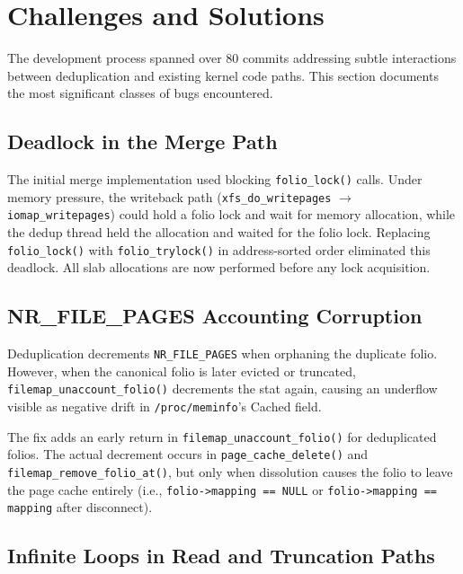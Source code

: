 \documentclass[conference]{IEEEtran}
\begin{document}
\section{Challenges and Solutions}
\label{sec:challenges}

The development process spanned over 80 commits addressing subtle interactions between deduplication and existing kernel code paths. This section documents the most significant classes of bugs encountered.

\subsection{Deadlock in the Merge Path}

The initial merge implementation used blocking \texttt{folio\_lock()} calls. Under memory pressure, the writeback path (\texttt{xfs\_do\_writepages} $\to$ \texttt{iomap\_writepages}) could hold a folio lock and wait for memory allocation, while the dedup thread held the allocation and waited for the folio lock. Replacing \texttt{folio\_lock()} with \texttt{folio\_trylock()} in address-sorted order eliminated this deadlock. All slab allocations are now performed before any lock acquisition.

\subsection{NR\_FILE\_PAGES Accounting Corruption}

Deduplication decrements \texttt{NR\_FILE\_PAGES} when orphaning the duplicate folio. However, when the canonical folio is later evicted or truncated, \texttt{filemap\_unaccount\_folio()} decrements the stat again, causing an underflow visible as negative drift in \texttt{/proc/meminfo}'s Cached field.

The fix adds an early return in \texttt{filemap\_unaccount\_folio()} for deduplicated folios. The actual decrement occurs in \texttt{page\_cache\_delete()} and \texttt{filemap\_remove\_folio\_at()}, but only when dissolution causes the folio to leave the page cache entirely (i.e., \texttt{folio->mapping == NULL} or \texttt{folio->mapping == mapping} after disconnect).

\subsection{Infinite Loops in Read and Truncation Paths}
\end{document}
